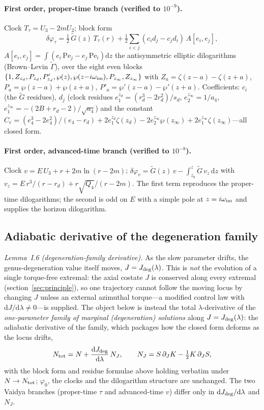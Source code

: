 \documentclass[12pt]{iopart}
\newcommand{\Jc}{J_{\rm deg}}
\newcommand{\dd}{\mathrm{d}}
\begin{document}
\paragraph{First order, proper-time branch (verified to $10^{-9}$).}
Clock $T_\tau=U_3-2mU_2$; block form
\begin{equation}
\delta\varphi_\tau=\tfrac12\,\tilde G(z)\,T_\tau(r)
+\tfrac12\sum_{i<j}(c_i d_j-c_j d_i)\,A[e_i,e_j],
\end{equation}
$A[e_i,e_j]=\int(e_i\,\mathrm{Pe}_j-e_j\,\mathrm{Pe}_i)\dd z$ the antisymmetric
elliptic dilogarithms (Brown--Levin $\tilde\Gamma$), over the eight even blocks
$\{1,Z_{z_d},P_{z_d},P'_{z_d},\wp(z),\wp(z{-}i\omega_{\rm im}),P_{z_\infty},
Z_{z_\infty}\}$ with $Z_a=\zeta(z{-}a)-\zeta(z{+}a)$,
$P_a=\wp(z{-}a)+\wp(z{+}a)$, $P'_a=\wp'(z{-}a)-\wp'(z{+}a)$. Coefficients: $c_i$ (the
$\tilde G$ residues), $d_j$ (clock residues $e_1^{z_d}=(r_d^3-2r_d^2)/s_d$,
$e_2^{z_\infty}=1/a_4$, $e_1^{z_\infty}=-(2B+r_d-2)/\sqrt{a_4}$) and the constant
$C_e=(e_4^3-2e_4^2)/(e_4-r_d)+2e_1^{z_d}\zeta(z_d)-2e_2^{z_\infty}\wp(z_\infty)
+2e_1^{z_\infty}\zeta(z_\infty)$---all closed form.

\paragraph{First order, advanced-time branch (verified to $10^{-8}$).}
Clock $v=E\,U_3+r+2m\ln(r-2m)$;
$\delta\varphi_v=\tilde G(z)\,v-\int_{z_0}^z\tilde G\,v_z\,\dd z$ with
$v_z=E\,r^3/(r-r_d)+r\sqrt{Q_4}/(r-2m)$. The first term reproduces the proper-time
dilogarithms; the second is odd on $E$ with a simple pole at $z=i\omega_{\rm im}$ and
supplies the horizon dilogarithm.

\subsection{Adiabatic derivative of the degeneration family}
\label{app:tracking}
\emph{Lemma~I.6 (degeneration-family derivative).} As the slow parameter drifts, the genus-degeneration value itself moves, $J=\Jc(\lambda)$. This is \emph{not} the evolution of a single torque-free extremal:
the axial costate $J$ is conserved along every extremal
(section~\ref{sec:principle}), so one trajectory cannot follow the moving locus by
changing $J$ unless an external azimuthal torque---a modified control law with
$\dd J/\dd\lambda\neq0$---is supplied. The object below is instead the total
$\lambda$-derivative of the \emph{one-parameter family of marginal (degeneration)
solutions} along $J=\Jc(\lambda)$: the adiabatic derivative of the family, which
packages how the closed form deforms as the locus drifts,
\begin{equation}
N_{\rm tot}=N+\frac{\dd\Jc}{\dd\lambda}\,N_J,\qquad
N_J=S\,\partial_JK-\tfrac12K\,\partial_JS,
\label{eq:Ntot-track}
\end{equation}
with the block form and residue formulae above holding verbatim under $N\to N_{\rm tot}$;
$\varphi_0$, the clocks and the dilogarithm structure are unchanged. The two Vaidya
branches (proper-time $\tau$ and advanced-time $v$) differ only in $\dd\Jc/\dd\lambda$
and $N_J$.
\end{document}
